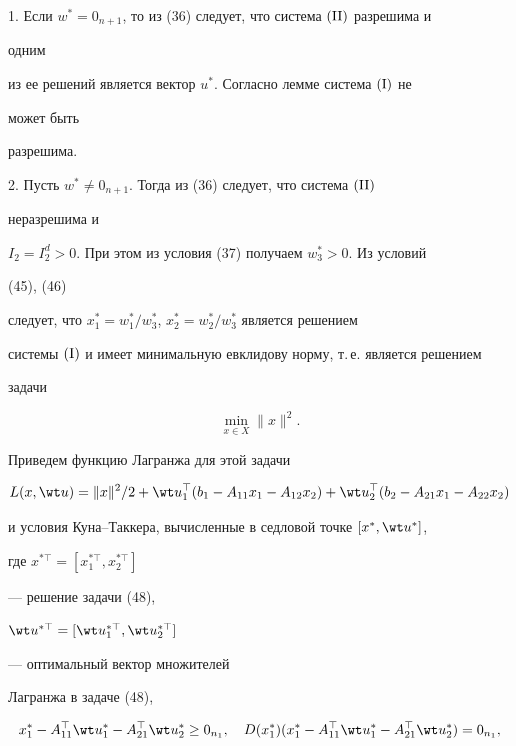 \begin{pf}


1. Если $w^*=0_{n+1}$, то из (36) следует, что система $(\mathrm{II})$ разрешима и 


одним


из ее решений является вектор $u^*$. Согласно лемме система $(\mathrm I)$ не 


может быть


разрешима.





2. Пусть $w^*\ne0_{n+1}$. Тогда из (36) следует, что система $(\mathrm{II})$ 


неразрешима и


$I_2=I^d_2>0$. При этом из условия (37) получаем $w^*_3>0$. Из условий 


(45), (46)


следует, что $x^*_1=w^*_1/w^*_3$, $x^*_2=w^*_2/w^*_3$ является решением 


системы $(\mathrm I)$ и имеет минимальную евклидову норму, т.\,е. является решением


задачи


\begin{equation}


\min_{x\in X}\|x\|^2.


\end{equation}





Приведем функцию Лагранжа для этой задачи


$$


L(x,\wt u)=\|x\|^2/2+\wt u^\top_1(b_1-A_{11}x_1-A_{12}x_2)+


\wt u^\top_2(b_2-A_{21}x_1-A_{22}x_2)


$$


и условия Куна--Таккера, вычисленные в седловой точке $[x^*,\wt u^*]$, 


где $x^{*\top}=[x^{*\top}_1,x^{*\top}_2]$


--- решение задачи (48),


$\wt u^{*\top}=[\wt u^{*\top}_1,\wt u^{*\top}_2]$


--- оптимальный вектор множителей


Лагранжа в задаче (48),


\begin{gather*}


x^*_1-A^\top_{11}\wt u^*_1-A^\top_{21}\wt u^*_2\ge0_{n_1},\quad


D(x^*_1)(x^*_1-A^\top_{11}\wt u^*_1-A^\top_{21}\wt u^*_2)=0_{n_1},



\end{gather*}
\end{pf}
